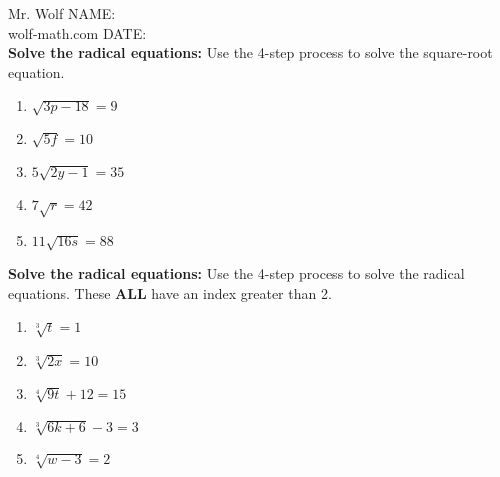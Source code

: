 \documentclass[12pt]{article}
\begin{document}
Mr. Wolf \hfill NAME:\underline{\hspace{3in}}\\ 
wolf-math.com \hfill DATE:\underline{\hspace{2in}}\\




\textbf{Solve the radical equations:} Use the 4-step process to solve the square-root equation.\\

\begin{enumerate}
	
		\item $\sqrt{3p-18}=9$\\
		
		\item $\sqrt{5f}=10$\\
		
		\item $5\sqrt{2y-1}=35$\\
		
		\item $7\sqrt{r}=42$\\
		
		\item $11\sqrt{16s}=88$\\
	
\end{enumerate}

\hrulefill

\textbf{Solve the radical equations:} Use the 4-step process to solve the radical equations. These \textbf{ALL} have an index greater than 2.\\

\begin{enumerate}[resume]

	\item $\sqrt[3]{t}=1$\\
	
	
	\item $\sqrt[3]{2x}=10$\\
	
	
	\item $\sqrt[4]{9t}+12=15$\\
	
	
	\item $\sqrt[3]{6k+6}-3=3$\\
	
	
	\item $\sqrt[4]{w-3}=2$\\

\end{enumerate}
\end{document}
